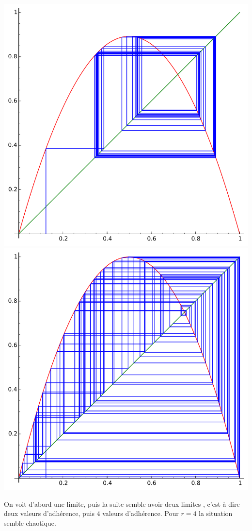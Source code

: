 \documentclass[class=report,crop=false]{standalone}
\begin{document}
\begin{enumerate}
\begin{center}
  \includegraphics[scale=0.3]{figures/chaos3}\quad
  \includegraphics[scale=0.3]{figures/chaos4}  
  \end{center}
  On voit d'abord une limite, puis la suite semble avoir \og deux limites \fg, c'est-à-dire
  deux valeurs d'adhérence, puis $4$ valeurs d'adhérence. Pour 
  $r=4$ la situation semble chaotique.
  

\end{enumerate}
\end{document}
